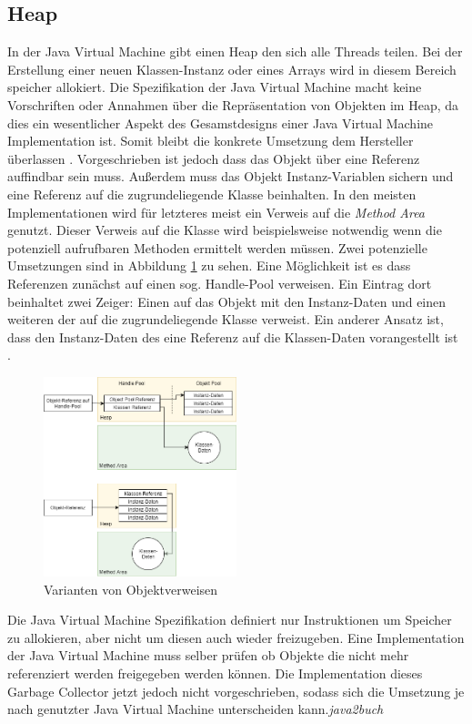 \documentclass[conference]{IEEEtran}
\begin{document}
\subsection{Heap}
In der Java Virtual Machine gibt einen Heap den sich alle Threads teilen. Bei der Erstellung einer neuen Klassen-Instanz oder eines Arrays wird in diesem Bereich speicher allokiert. Die Spezifikation der Java Virtual Machine macht keine Vorschriften oder Annahmen über die Repräsentation von Objekten im Heap, da dies ein wesentlicher Aspekt des Gesamstdesigns einer Java Virtual Machine Implementation ist. Somit bleibt die konkrete Umsetzung dem Hersteller überlassen \cite{Lindholm.21.08.2018}. Vorgeschrieben ist jedoch dass das Objekt über eine Referenz auffindbar sein muss. Außerdem muss das Objekt Instanz-Variablen sichern und eine Referenz auf die zugrundeliegende Klasse beinhalten. In den meisten Implementationen wird für letzteres meist ein Verweis auf die \textit{Method Area} genutzt. Dieser Verweis auf die Klasse wird beispielsweise notwendig wenn die potenziell aufrufbaren Methoden ermittelt werden müssen. Zwei potenzielle Umsetzungen sind in Abbildung \ref{fig:objektverweise} zu sehen. Eine Möglichkeit ist es dass Referenzen zunächst auf einen sog. Handle-Pool verweisen. Ein Eintrag dort beinhaltet zwei Zeiger: Einen auf das Objekt mit den Instanz-Daten und einen weiteren der auf die zugrundeliegende Klasse verweist. Ein anderer Ansatz ist, dass den Instanz-Daten des eine Referenz auf die Klassen-Daten vorangestellt ist \cite{Venners.1999}.
\begin{figure}[htbp] 
  \centering
     \includegraphics[width=0.5\textwidth]{Grafiken/ObjektReferenzKlasse.png}
  \caption{Varianten von Objektverweisen}
  \label{fig:objektverweise}
\end{figure}
Die Java Virtual Machine Spezifikation definiert nur Instruktionen um Speicher zu allokieren, aber nicht um diesen auch wieder freizugeben. Eine Implementation der Java Virtual Machine muss selber prüfen ob Objekte die nicht mehr referenziert werden freigegeben werden können. Die Implementation dieses Garbage Collector jetzt jedoch nicht vorgeschrieben, sodass sich die Umsetzung je nach genutzter Java Virtual Machine unterscheiden kann.\textit{java2buch} %
\end{document}
